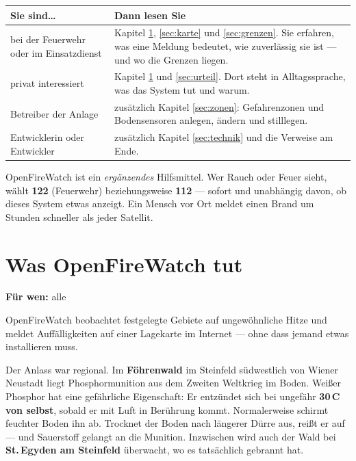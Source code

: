 \documentclass[11pt,a4paper,DIV=12,parskip=half]{scrartcl}
\newcommand{\zielgruppe}[1]{\begin{fuerwen}\textbf{Für wen:} #1\end{fuerwen}}
\begin{document}
\begin{center}
\begin{tabularx}{\textwidth}{@{}lX@{}}
\toprule
\textbf{Sie sind\ldots} & \textbf{Dann lesen Sie} \\
\midrule
bei der Feuerwehr oder im Einsatzdienst &
Kapitel \ref{sec:was}, \ref{sec:karte} und \ref{sec:grenzen}. Sie erfahren,
was eine Meldung bedeutet, wie zuverlässig sie ist --- und wo die Grenzen
liegen. \\[4pt]
privat interessiert &
Kapitel \ref{sec:was} und \ref{sec:urteil}. Dort steht in Alltagssprache,
was das System tut und warum. \\[4pt]
Betreiber der Anlage &
zusätzlich Kapitel \ref{sec:zonen}: Gefahrenzonen und Bodensensoren anlegen,
ändern und stilllegen. \\[4pt]
Entwicklerin oder Entwickler &
zusätzlich Kapitel \ref{sec:technik} und die Verweise am Ende. \\
\bottomrule
\end{tabularx}
\end{center}

\begin{warnung}
OpenFireWatch ist ein \emph{ergänzendes} Hilfsmittel. Wer Rauch oder Feuer
sieht, wählt \textbf{122} (Feuerwehr) beziehungsweise \textbf{112} --- sofort
und unabhängig davon, ob dieses System etwas anzeigt. Ein Mensch vor Ort meldet
einen Brand um Stunden schneller als jeder Satellit.
\end{warnung}

\section{Was OpenFireWatch tut}\label{sec:was}
\zielgruppe{alle}

OpenFireWatch beobachtet festgelegte Gebiete auf ungewöhnliche Hitze und meldet
Auffälligkeiten auf einer Lagekarte im Internet --- ohne dass jemand etwas
installieren muss.

Der Anlass war regional. Im \textbf{Föhrenwald} im Steinfeld südwestlich von
Wiener Neustadt liegt Phosphormunition aus dem Zweiten Weltkrieg im Boden.
Weißer Phosphor hat eine gefährliche Eigenschaft: Er entzündet sich bei
ungefähr \textbf{30\,\textdegree C von selbst}, sobald er mit Luft in Berührung
kommt. Normalerweise schirmt feuchter Boden ihn ab. Trocknet der Boden nach
längerer Dürre aus, reißt er auf --- und Sauerstoff gelangt an die Munition.
Inzwischen wird auch der Wald bei \textbf{St.\,Egyden am Steinfeld} überwacht,
wo es tatsächlich gebrannt hat.
\end{document}
